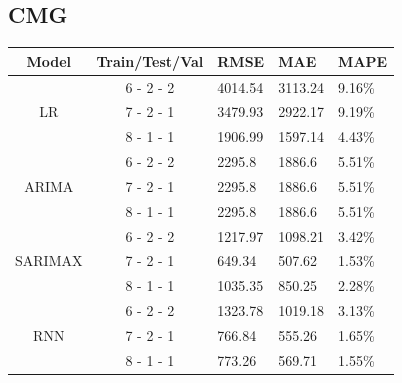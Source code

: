 \documentclass{ieeeojies}
\begin{document}
\subsection{CMG}
\begin{table}[H]
    \renewcommand{\arraystretch}{1.5}
    \centering
    \begin{tabular}{|c|c|p{1cm}|p{1cm}|p{1cm}|}
        \hline
        \textbf{Model} & \textbf{Train/Test/Val} & \textbf{RMSE} & \textbf{MAE} & \textbf{MAPE} \\
        \hline
        \multirow{3}{*}{LR}
                       & 6 - 2 - 2               & 4014.54       & 3113.24      & 9.16\%        \\
        \cline{2-5}
                       & 7 - 2 - 1               & 3479.93       & 2922.17      & 9.19\%        \\
        \cline{2-5}
                       & 8 - 1 - 1               & 1906.99       & 1597.14      & 4.43\%        \\
        \hline
        \multirow{3}{*}{ARIMA}
                       & 6 - 2 - 2               & 2295.8        & 1886.6       & 5.51\%        \\
        \cline{2-5}
                       & 7 - 2 - 1               & 2295.8        & 1886.6       & 5.51\%        \\
        \cline{2-5}
                       & 8 - 1 - 1               & 2295.8        & 1886.6       & 5.51\%        \\
        \hline
        \multirow{3}{*}{SARIMAX}
                       & 6 - 2 - 2               & 1217.97       & 1098.21      & 3.42\%        \\
        \cline{2-5}
                       & 7 - 2 - 1               & 649.34        & 507.62       & 1.53\%        \\
        \cline{2-5}
                       & 8 - 1 - 1               & 1035.35       & 850.25       & 2.28\%        \\
        \hline
        \multirow{3}{*}{RNN}
                       & 6 - 2 - 2               & 1323.78       & 1019.18      & 3.13\%        \\
        \cline{2-5}
                       & 7 - 2 - 1               & 766.84        & 555.26       & 1.65\%        \\
        \cline{2-5}
                       & 8 - 1 - 1               & 773.26        & 569.71       & 1.55\%        \\

\end{tabular}
\end{table}
\end{document}
